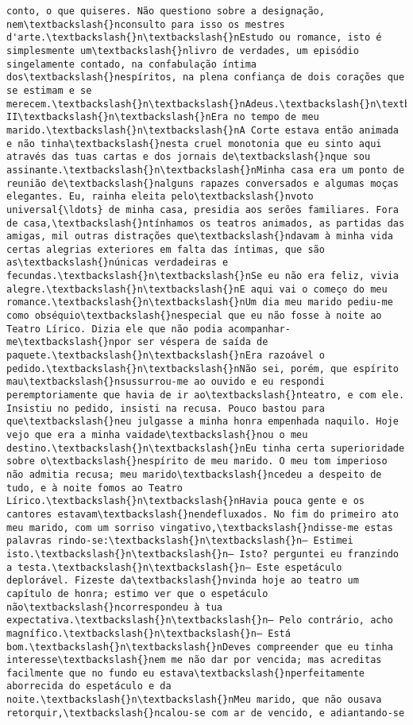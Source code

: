 \begin{Verbatim}[commandchars=\\\{\}]
conto, o que quiseres. Não questiono sobre a designação, nem\textbackslash{}nconsulto para isso os mestres d'arte.\textbackslash{}n\textbackslash{}nEstudo ou romance, isto é simplesmente um\textbackslash{}nlivro de verdades, um episódio singelamente contado, na confabulação íntima dos\textbackslash{}nespíritos, na plena confiança de dois corações que se estimam e se merecem.\textbackslash{}n\textbackslash{}nAdeus.\textbackslash{}n\textbackslash{}nCAPÍTULO II\textbackslash{}n\textbackslash{}nEra no tempo de meu marido.\textbackslash{}n\textbackslash{}nA Corte estava então animada e não tinha\textbackslash{}nesta cruel monotonia que eu sinto aqui através das tuas cartas e dos jornais de\textbackslash{}nque sou assinante.\textbackslash{}n\textbackslash{}nMinha casa era um ponto de reunião de\textbackslash{}nalguns rapazes conversados e algumas moças elegantes. Eu, rainha eleita pelo\textbackslash{}nvoto universal{\ldots} de minha casa, presidia aos serões familiares. Fora de casa,\textbackslash{}ntínhamos os teatros animados, as partidas das amigas, mil outras distrações que\textbackslash{}ndavam à minha vida certas alegrias exteriores em falta das íntimas, que são as\textbackslash{}núnicas verdadeiras e fecundas.\textbackslash{}n\textbackslash{}nSe eu não era feliz, vivia alegre.\textbackslash{}n\textbackslash{}nE aqui vai o começo do meu romance.\textbackslash{}n\textbackslash{}nUm dia meu marido pediu-me como obséquio\textbackslash{}nespecial que eu não fosse à noite ao Teatro Lírico. Dizia ele que não podia acompanhar-me\textbackslash{}npor ser véspera de saída de paquete.\textbackslash{}n\textbackslash{}nEra razoável o pedido.\textbackslash{}n\textbackslash{}nNão sei, porém, que espírito mau\textbackslash{}nsussurrou-me ao ouvido e eu respondi peremptoriamente que havia de ir ao\textbackslash{}nteatro, e com ele. Insistiu no pedido, insisti na recusa. Pouco bastou para que\textbackslash{}neu julgasse a minha honra empenhada naquilo. Hoje vejo que era a minha vaidade\textbackslash{}nou o meu destino.\textbackslash{}n\textbackslash{}nEu tinha certa superioridade sobre o\textbackslash{}nespírito de meu marido. O meu tom imperioso não admitia recusa; meu marido\textbackslash{}ncedeu a despeito de tudo, e à noite fomos ao Teatro Lírico.\textbackslash{}n\textbackslash{}nHavia pouca gente e os cantores estavam\textbackslash{}nendefluxados. No fim do primeiro ato meu marido, com um sorriso vingativo,\textbackslash{}ndisse-me estas palavras rindo-se:\textbackslash{}n\textbackslash{}n— Estimei isto.\textbackslash{}n\textbackslash{}n— Isto? perguntei eu franzindo a testa.\textbackslash{}n\textbackslash{}n— Este espetáculo deplorável. Fizeste da\textbackslash{}nvinda hoje ao teatro um capítulo de honra; estimo ver que o espetáculo não\textbackslash{}ncorrespondeu à tua expectativa.\textbackslash{}n\textbackslash{}n— Pelo contrário, acho magnífico.\textbackslash{}n\textbackslash{}n— Está bom.\textbackslash{}n\textbackslash{}nDeves compreender que eu tinha interesse\textbackslash{}nem me não dar por vencida; mas acreditas facilmente que no fundo eu estava\textbackslash{}nperfeitamente aborrecida do espetáculo e da noite.\textbackslash{}n\textbackslash{}nMeu marido, que não ousava retorquir,\textbackslash{}ncalou-se com ar de vencido, e adiantando-se 
\end{Verbatim}
